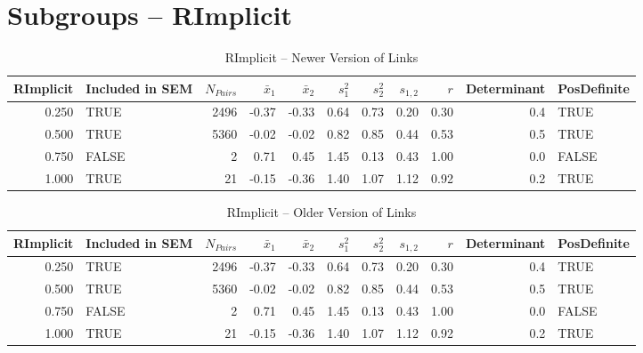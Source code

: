 \documentclass{article}\usepackage[]{graphicx}\usepackage[]{color}
\begin{document}
\section{Subgroups --  RImplicit }%
\begin{table}[ht]
\centering
\begin{tabular}{rlrrrrrrrrl}
  \hline
RImplicit & Included in SEM & $N_{Pairs}$ & $\bar{x}_1$ & $\bar{x}_2$ & $s_1^2$ & $s_2^2$ & $s_{1,2}$ & $r$ & Determinant & PosDefinite \\ 
  \hline
0.250 & TRUE & 2496 & -0.37 & -0.33 & 0.64 & 0.73 & 0.20 & 0.30 & 0.4 & TRUE \\ 
  0.500 & TRUE & 5360 & -0.02 & -0.02 & 0.82 & 0.85 & 0.44 & 0.53 & 0.5 & TRUE \\ 
  0.750 & FALSE & 2 & 0.71 & 0.45 & 1.45 & 0.13 & 0.43 & 1.00 & 0.0 & FALSE \\ 
  1.000 & TRUE & 21 & -0.15 & -0.36 & 1.40 & 1.07 & 1.12 & 0.92 & 0.2 & TRUE \\ 
   \hline
\end{tabular}
\caption{RImplicit -- Newer Version of Links} 
\end{table}
\begin{table}[ht]
\centering
\begin{tabular}{rlrrrrrrrrl}
  \hline
RImplicit & Included in SEM & $N_{Pairs}$ & $\bar{x}_1$ & $\bar{x}_2$ & $s_1^2$ & $s_2^2$ & $s_{1,2}$ & $r$ & Determinant & PosDefinite \\ 
  \hline
0.250 & TRUE & 2496 & -0.37 & -0.33 & 0.64 & 0.73 & 0.20 & 0.30 & 0.4 & TRUE \\ 
  0.500 & TRUE & 5360 & -0.02 & -0.02 & 0.82 & 0.85 & 0.44 & 0.53 & 0.5 & TRUE \\ 
  0.750 & FALSE & 2 & 0.71 & 0.45 & 1.45 & 0.13 & 0.43 & 1.00 & 0.0 & FALSE \\ 
  1.000 & TRUE & 21 & -0.15 & -0.36 & 1.40 & 1.07 & 1.12 & 0.92 & 0.2 & TRUE \\ 
   \hline
\end{tabular}
\caption{RImplicit -- Older Version of Links} 
\end{table}
\end{document}
